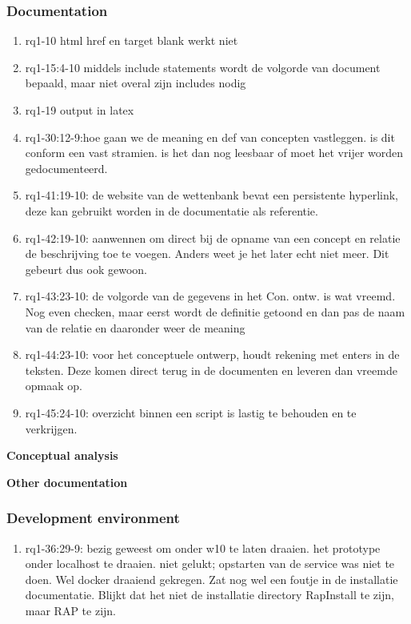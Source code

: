 \subsubsection{Documentation}
\begin{comment}
plaats hier de afgehandelde items.
\end{comment}
\begin{enumerate}
    \item rq1-10 html href en target blank werkt niet    
    \item rq1-15:4-10 middels include statements wordt de volgorde van document bepaald, maar niet overal zijn includes nodig
    \item rq1-19 output in latex 
    \item rq1-30:12-9:hoe gaan we de meaning en def van concepten vastleggen. is dit conform een vast stramien. is het dan nog leesbaar of moet het vrijer worden gedocumenteerd.
    \item rq1-41:19-10: de website van de wettenbank bevat een persistente hyperlink, deze kan gebruikt worden in de documentatie als referentie.
    \item rq1-42:19-10: aanwennen om direct bij de opname van een concept en relatie de beschrijving toe te voegen. Anders weet je het later echt niet meer. Dit gebeurt dus ook gewoon.
    \item rq1-43:23-10: de volgorde van de gegevens in het Con. ontw. is wat vreemd. Nog even checken, maar eerst wordt de definitie getoond en dan pas de naam van de relatie en daaronder weer de meaning
    \item rq1-44:23-10: voor het conceptuele ontwerp, houdt rekening met enters in de teksten. Deze komen direct terug in de documenten en leveren dan vreemde opmaak op.
    \item rq1-45:24-10: overzicht binnen een script is lastig te behouden en te verkrijgen.
    
    
\end{enumerate}

\textbf{Conceptual analysis}
    

\textbf{Other documentation}

\subsubsection{Development environment}
\begin{comment}
plaats hier de afgehandelde items.
\end{comment}
\begin{enumerate}
    \item rq1-36:29-9: bezig geweest om onder w10 te laten draaien. het prototype onder localhost te draaien. niet gelukt; opstarten van de service was niet te doen. Wel docker draaiend gekregen. Zat nog wel een foutje in de installatie documentatie. Blijkt dat het niet de installatie directory RapInstall te zijn, maar RAP te zijn.
\end{enumerate}

